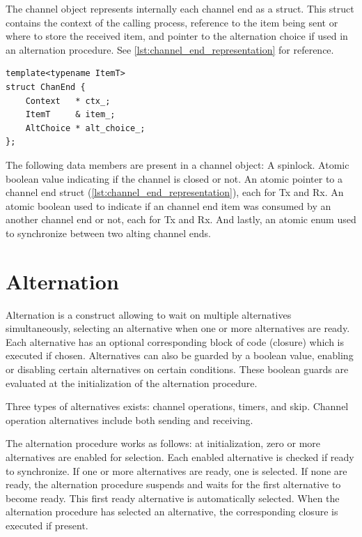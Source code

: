 The channel object represents internally each channel end as a struct. This struct contains the context of the calling process, reference to the item being sent or where to store the received item, and pointer to the alternation choice if used in an alternation procedure. See \cref{lst:channel_end_representation} for reference. 

\begin{lstfloat}
\begin{lstlisting}[caption={Channel end representation in channel object.}, label={lst:channel_end_representation}, style={CustomC++}, xleftmargin={4em}]
template<typename ItemT>
struct ChanEnd {
    Context   * ctx_;
    ItemT     & item_;
    AltChoice * alt_choice_;
};
\end{lstlisting}
\end{lstfloat}

The following data members are present in a channel object: A spinlock. Atomic boolean value indicating if the channel is closed or not. An atomic pointer to a channel end struct (\cref{lst:channel_end_representation}), each for Tx and Rx. An atomic boolean used to indicate if an channel end item was consumed by an another channel end or not, each for Tx and Rx. And lastly, an atomic enum used to synchronize between two alting channel ends.


\FloatBarrier
\section{Alternation}
\label{sec:alternation}

Alternation is a construct allowing to wait on multiple alternatives simultaneously, selecting an alternative when one or more alternatives are ready. Each alternative has an optional corresponding block of code (closure) which is executed if chosen. Alternatives can also be guarded by a boolean value, enabling or disabling certain alternatives on certain conditions. These boolean guards are evaluated at the initialization of the alternation procedure.

Three types of alternatives exists: channel operations, timers, and skip. Channel operation alternatives include both sending and receiving.

The alternation procedure works as follows: at initialization, zero or more alternatives are enabled for selection. Each enabled alternative is checked if ready to synchronize. If one or more alternatives are ready, one is selected. If none are ready, the alternation procedure suspends and waits for the first alternative to become ready. This first ready alternative is automatically selected. When the alternation procedure has selected an alternative, the corresponding closure is executed if present.

